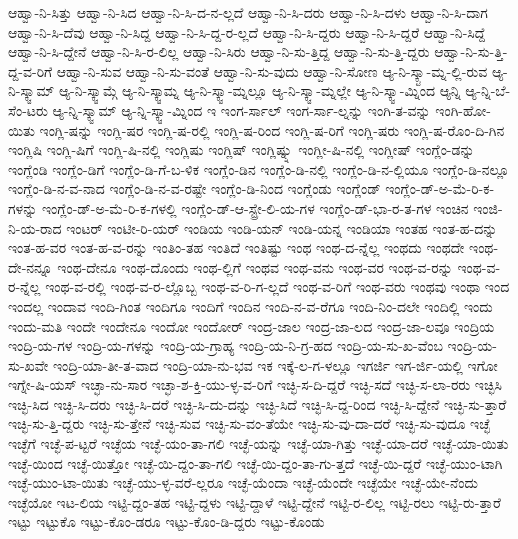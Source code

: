 {ಆಹ್ವಾ-ನಿ-ಸಿತ್ತು
ಆಹ್ವಾ-ನಿ-ಸಿದ
ಆಹ್ವಾ-ನಿ-ಸಿ-ದ-ನ-ಲ್ಲದೆ
ಆಹ್ವಾ-ನಿ-ಸಿ-ದರು
ಆಹ್ವಾ-ನಿ-ಸಿ-ದಳು
ಆಹ್ವಾ-ನಿ-ಸಿ-ದಾಗ
ಆಹ್ವಾ-ನಿ-ಸಿ-ದೆವು
ಆಹ್ವಾ-ನಿ-ಸಿದ್ದ
ಆಹ್ವಾ-ನಿ-ಸಿ-ದ್ದ-ರ-ಲ್ಲದೆ
ಆಹ್ವಾ-ನಿ-ಸಿ-ದ್ದರು
ಆಹ್ವಾ-ನಿ-ಸಿ-ದ್ದರೆ
ಆಹ್ವಾ-ನಿ-ಸಿದ್ದೆ
ಆಹ್ವಾ-ನಿ-ಸಿ-ದ್ದೇನೆ
ಆಹ್ವಾ-ನಿ-ಸಿ-ರ-ಲಿಲ್ಲ
ಆಹ್ವಾ-ನಿ-ಸಿರು
ಆಹ್ವಾ-ನಿ-ಸು-ತ್ತಿದ್ದ
ಆಹ್ವಾ-ನಿ-ಸು-ತ್ತಿ-ದ್ದರು
ಆಹ್ವಾ-ನಿ-ಸು-ತ್ತಿ-ದ್ದ-ವ-ರಿಗೆ
ಆಹ್ವಾ-ನಿ-ಸುವ
ಆಹ್ವಾ-ನಿ-ಸು-ವಂತೆ
ಆಹ್ವಾ-ನಿ-ಸು-ವುದು
ಆಹ್ವಾ-ನಿ-ಸೋಣ
ಆ್ಯ-ನಿ-ಸ್ಕ್ಟಾ-ಮ್ನ-ಲ್ಲಿ-ರುವ
ಆ್ಯ-ನಿ-ಸ್ಕ್ವಾಮ್
ಆ್ಯ-ನಿ-ಸ್ಕ್ವಾಮ್ಗೆ
ಆ್ಯ-ನಿ-ಸ್ಕ್ವಾಮ್ನ
ಆ್ಯ-ನಿ-ಸ್ಕ್ವಾ-ಮ್ನಲ್ಲೂ
ಆ್ಯ-ನಿ-ಸ್ಕ್ವಾ-ಮ್ನಲ್ಲೇ
ಆ್ಯ-ನಿ-ಸ್ಕ್ವಾ-ಮ್ನಿಂದ
ಆ್ಯನ್ನಿ
ಆ್ಯ-ನ್ನಿ-ಬೆ-ಸೆಂ-ಟರು
ಆ್ಯ-ನ್ನಿ-ಸ್ಕ್ವಾಮ್
ಆ್ಯ-ನ್ನಿ-ಸ್ಕ್ವಾ-ಮ್ನಿಂದ
ಇ
ಇಂಗ-ರ್ಸಾಲ್
ಇಂಗ-ರ್ಸಾ-ಲ್ನನ್ನು
ಇಂಗಿ-ತ-ವನ್ನು
ಇಂಗಿ-ಹೋ-ಯಿತು
ಇಂಗ್ಲಿ-ಷನ್ನು
ಇಂಗ್ಲಿ-ಷರ
ಇಂಗ್ಲಿ-ಷ-ರಲ್ಲಿ
ಇಂಗ್ಲಿ-ಷ-ರಿಂದ
ಇಂಗ್ಲಿ-ಷ-ರಿಗೆ
ಇಂಗ್ಲಿ-ಷರು
ಇಂಗ್ಲಿ-ಷ-ರೊಂ-ದಿ-ಗಿನ
ಇಂಗ್ಲಿಷಿ
ಇಂಗ್ಲಿ-ಷಿಗೆ
ಇಂಗ್ಲಿ-ಷಿ-ನಲ್ಲಿ
ಇಂಗ್ಲಿಷು
ಇಂಗ್ಲಿಷ್
ಇಂಗ್ಲಿಷ್ನ್ನು
ಇಂಗ್ಲೀ-ಷಿ-ನಲ್ಲಿ
ಇಂಗ್ಲೀಷ್
ಇಂಗ್ಲೆಂ-ಡನ್ನು
ಇಂಗ್ಲೆಂಡಿ
ಇಂಗ್ಲೆಂ-ಡಿಗೆ
ಇಂಗ್ಲೆಂ-ಡಿ-ಗೆ-ಬ-ಳಿಕ
ಇಂಗ್ಲೆಂ-ಡಿನ
ಇಂಗ್ಲೆಂ-ಡಿ-ನಲ್ಲಿ
ಇಂಗ್ಲೆಂ-ಡಿ-ನ-ಲ್ಲಿಯೂ
ಇಂಗ್ಲೆಂ-ಡಿ-ನಲ್ಲೂ
ಇಂಗ್ಲೆಂ-ಡಿ-ನ-ವ-ನಾದ
ಇಂಗ್ಲೆಂ-ಡಿ-ನ-ವ-ರಷ್ಟೇ
ಇಂಗ್ಲೆಂ-ಡಿ-ನಿಂದ
ಇಂಗ್ಲೆಂಡು
ಇಂಗ್ಲೆಂಡ್
ಇಂಗ್ಲೆಂ-ಡ್-ಅ-ಮೆ-ರಿ-ಕ-ಗಳನ್ನು
ಇಂಗ್ಲೆಂ-ಡ್-ಅ-ಮೆ-ರಿ-ಕ-ಗಳಲ್ಲಿ
ಇಂಗ್ಲೆಂ-ಡ್-ಆ-ಸ್ಟ್ರೇ-ಲಿ-ಯ-ಗಳ
ಇಂಗ್ಲೆಂ-ಡ್-ಭಾ-ರ-ತ-ಗಳ
ಇಂಚಿನ
ಇಂಜಿ-ನಿ-ಯ-ರಾದ
ಇಂಟರ್
ಇಂಟೀ-ರಿ-ಯರ್
ಇಂಡಿಯ
ಇಂಡಿ-ಯನ್
ಇಂಡಿ-ಯನ್ನ
ಇಂಡಿಯಾ
ಇಂತಹ
ಇಂತ-ಹ-ದನ್ನು
ಇಂತ-ಹ-ವರ
ಇಂತ-ಹ-ವ-ರನ್ನು
ಇಂತಿಂ-ತಹ
ಇಂತಿದೆ
ಇಂತಿಷ್ಟು
ಇಂಥ
ಇಂಥ-ದ-ನ್ನೆಲ್ಲ
ಇಂಥದು
ಇಂಥದೇ
ಇಂಥ-ದೇ-ನನ್ನೂ
ಇಂಥ-ದೇನೂ
ಇಂಥ-ದೊಂದು
ಇಂಥ-ಲ್ಲಿಗೆ
ಇಂಥವ
ಇಂಥ-ವನು
ಇಂಥ-ವರ
ಇಂಥ-ವ-ರನ್ನು
ಇಂಥ-ವ-ರ-ನ್ನೆಲ್ಲ
ಇಂಥ-ವ-ರಲ್ಲಿ
ಇಂಥ-ವ-ರ-ಲ್ಲೊಬ್ಬ
ಇಂಥ-ವ-ರಿ-ಗ-ಲ್ಲದೆ
ಇಂಥ-ವ-ರಿಗೆ
ಇಂಥ-ವರು
ಇಂಥವು
ಇಂಥಾ
ಇಂದ
ಇಂದಲ್ಲ
ಇಂದಾವ
ಇಂದಿ-ಗಿಂತ
ಇಂದಿಗೂ
ಇಂದಿಗೆ
ಇಂದಿನ
ಇಂದಿ-ನ-ವ-ರೆಗೂ
ಇಂದಿ-ನಿಂ-ದಲೇ
ಇಂದಿಲ್ಲಿ
ಇಂದು
ಇಂದು-ಮತಿ
ಇಂದೇ
ಇಂದೇನೂ
ಇಂದೋ
ಇಂದೋರ್
ಇಂದ್ರ-ಜಾಲ
ಇಂದ್ರ-ಜಾ-ಲದ
ಇಂದ್ರ-ಜಾ-ಲವೂ
ಇಂದ್ರಿಯ
ಇಂದ್ರಿ-ಯ-ಗಳ
ಇಂದ್ರಿ-ಯ-ಗಳನ್ನು
ಇಂದ್ರಿ-ಯ-ಗ್ರಾಹ್ಯ
ಇಂದ್ರಿ-ಯ-ನಿ-ಗ್ರ-ಹದ
ಇಂದ್ರಿ-ಯ-ಸು-ಖ-ವೆಂಬ
ಇಂದ್ರಿ-ಯ-ಸು-ಖವೇ
ಇಂದ್ರಿ-ಯಾ-ತೀ-ತ-ವಾದ
ಇಂದ್ರಿ-ಯಾ-ನು-ಭವ
ಇಕ
ಇಕ್ಕೆ-ಲ-ಗ-ಳಲ್ಲೂ
ಇಗರ್ಜಿ
ಇಗ-ರ್ಜಿ-ಯಲ್ಲಿ
ಇಗೋ
ಇಗ್ನೇ-ಷಿ-ಯಸ್
ಇಚ್ಛಾ-ನು-ಸಾರ
ಇಚ್ಛಾ-ಶ-ಕ್ತಿ-ಯು-ಳ್ಳ-ವ-ರಿಗೆ
ಇಚ್ಛಿ-ಸ-ದಿ-ದ್ದರೆ
ಇಚ್ಛಿ-ಸದೆ
ಇಚ್ಛಿ-ಸ-ಲಾ-ರರು
ಇಚ್ಛಿಸಿ
ಇಚ್ಛಿ-ಸಿದ
ಇಚ್ಛಿ-ಸಿ-ದರು
ಇಚ್ಛಿ-ಸಿ-ದರೆ
ಇಚ್ಛಿ-ಸಿ-ದು-ದನ್ನು
ಇಚ್ಛಿ-ಸಿದೆ
ಇಚ್ಛಿ-ಸಿ-ದ್ದ-ರಿಂದ
ಇಚ್ಛಿ-ಸಿ-ದ್ದೇನೆ
ಇಚ್ಛಿ-ಸು-ತ್ತಾರೆ
ಇಚ್ಛಿ-ಸು-ತ್ತಿ-ದ್ದರು
ಇಚ್ಛಿ-ಸು-ತ್ತೇನೆ
ಇಚ್ಛಿ-ಸುವ
ಇಚ್ಛಿ-ಸು-ವಂ-ತೆಯೇ
ಇಚ್ಛಿ-ಸು-ವು-ದಾ-ದರೆ
ಇಚ್ಛಿ-ಸು-ವುದೂ
ಇಚ್ಛೆ
ಇಚ್ಛೆಗೆ
ಇಚ್ಛೆ-ಪ-ಟ್ಟರೆ
ಇಚ್ಛೆಯ
ಇಚ್ಛೆ-ಯಂ-ತಾ-ಗಲಿ
ಇಚ್ಛೆ-ಯನ್ನು
ಇಚ್ಛೆ-ಯಾ-ಗಿತ್ತು
ಇಚ್ಛೆ-ಯಾ-ದರೆ
ಇಚ್ಛೆ-ಯಾ-ಯಿತು
ಇಚ್ಛೆ-ಯಿಂದ
ಇಚ್ಛೆ-ಯಿತ್ತೋ
ಇಚ್ಛೆ-ಯಿ-ದ್ದಂ-ತಾ-ಗಲಿ
ಇಚ್ಛೆ-ಯಿ-ದ್ದಂ-ತಾ-ಗು-ತ್ತದೆ
ಇಚ್ಛೆ-ಯಿ-ದ್ದರೆ
ಇಚ್ಛೆ-ಯುಂ-ಟಾಗಿ
ಇಚ್ಛೆ-ಯುಂ-ಟಾ-ಯಿತು
ಇಚ್ಛೆ-ಯು-ಳ್ಳ-ವರೆ-ಲ್ಲರೂ
ಇಚ್ಛೆ-ಯೆಂದಾ
ಇಚ್ಛೆ-ಯೆಂದೇ
ಇಚ್ಛೆಯೇ
ಇಚ್ಛೆ-ಯೇ-ನೆಂದು
ಇಚ್ಛೆಯೋ
ಇಟ-ಲಿಯ
ಇಟ್ಟಿ-ದ್ದಂ-ತಹ
ಇಟ್ಟಿ-ದ್ದಳು
ಇಟ್ಟಿ-ದ್ದಾಳೆ
ಇಟ್ಟಿ-ದ್ದೇನೆ
ಇಟ್ಟಿ-ರ-ಲಿಲ್ಲ
ಇಟ್ಟಿ-ರಲು
ಇಟ್ಟಿ-ರು-ತ್ತಾರೆ
ಇಟ್ಟು
ಇಟ್ಟುಕೊ
ಇಟ್ಟು-ಕೊಂ-ಡರೂ
ಇಟ್ಟು-ಕೊಂ-ಡಿ-ದ್ದರು
ಇಟ್ಟು-ಕೊಂಡು
}
